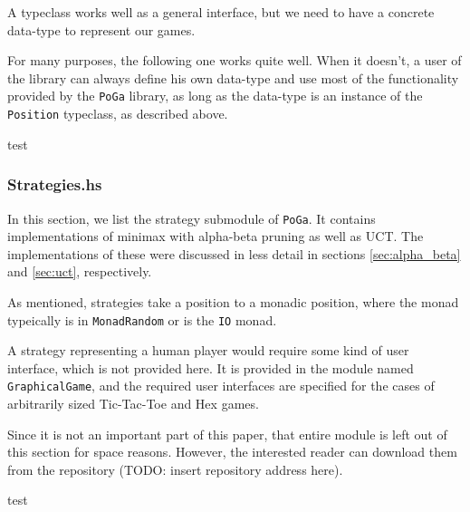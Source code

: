 A typeclass works well as a general interface, but we need to have a concrete data-type to represent our games.

For many purposes, the following one works quite well. When it doesn't, a user of the library can always define his own data-type and use most of the functionality provided by the \texttt{PoGa} library, as long as the data-type is an instance of the \texttt{Position} typeclass, as described above.

\begin{code}
test
\end{code}

\subsubsection {Strategies.hs}

In this section, we list the strategy submodule of \texttt{PoGa}.
It contains implementations of minimax with alpha-beta pruning as well as UCT.
The implementations of these were discussed in less detail in sections \ref{sec:alpha_beta} and \ref{sec:uct}, respectively.


As mentioned, strategies take a position to a monadic position, where the monad typeically is in \texttt{MonadRandom} or is the \texttt{IO} monad.

A strategy representing a human player would require some kind of user interface, which is not provided here.
It is provided in the module named \texttt{GraphicalGame}, and the required user interfaces are specified for the cases of arbitrarily sized Tic-Tac-Toe and Hex games.

Since it is not an important part of this paper, that entire module is left out of this section for space reasons.
However, the interested reader can download them from the repository (TODO: insert repository address here).

\begin{code}
test
\end{code}
